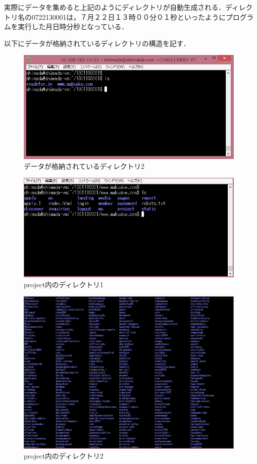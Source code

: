 実際にデータを集めると上記のようにディレクトリが自動生成される．ディレクトリ名の0722130001は，７月２２日１３時００分０１秒といったようにプログラムを実行した月日時分秒となっている．


\newpage

以下にデータが格納されているディレクトリの構造を記す．

\begin{figure}[H]
\centering
\includegraphics[width=12cm]{hozon4.PNG}
\caption{データが格納されているディレクトリ2}\label{サンプル図}
\end{figure}

\begin{figure}[H]
\centering
\includegraphics[width=12cm]{hozon5.PNG}
\caption{project内のディレクトリ1}\label{サンプル図}
\end{figure}
\newpage


\begin{figure}[H]
\centering
\includegraphics[width=12cm]{hozon6.PNG}
\caption{project内のディレクトリ2}\label{サンプル図}
\end{figure}
\newpage

